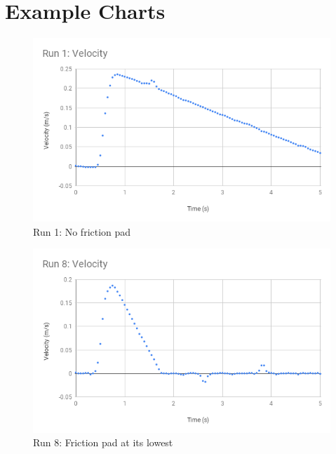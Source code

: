 \section{Example Charts}
%
\begin{figure}[ht]
    \centering
    \includegraphics[scale=0.71]{image/03-first-law/Run-1-Velocity.png}
    \caption{Run 1: No friction pad}
    \label{figure:03.run-1}
\end{figure}
%
\begin{figure}[ht]
    \centering
    \includegraphics[scale=0.71]{image/03-first-law/Run-8-Velocity.png}
    \caption{Run 8: Friction pad at its lowest}
    \label{figure:03.run-8}
\end{figure}
%
